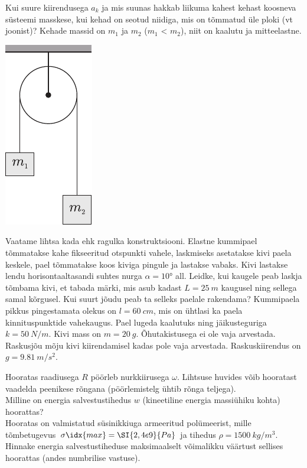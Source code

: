 \documentclass[10pt]{article}
\begin{document}
{%

Kui suure kiirendusega $a_k$ ja mis suunas hakkab liikuma kahest kehast koosneva süsteemi masskese, kui kehad on seotud niidiga, mis on tõmmatud üle ploki (vt joonist)? Kehade massid on $m_1$ ja $m_2$ ($m_1$ < $m_2$), niit on kaalutu ja mitteelastne.
\begin{center}
	\includegraphics[width=0.25\linewidth]{2006-lahg-05-yl}
\end{center}
\probend
\bigskip


Vaatame lihtsa kada ehk ragulka konstruktsiooni. Elastne kummipael tõmmatakse kahe fikseeritud otspunkti vahele, laskmiseks asetatakse kivi paela keskele, pael tõmmatakse koos kiviga pingule ja lastakse vabaks. Kivi lastakse lendu horisontaaltasandi suhtes nurga $\alpha = \ang{10}$ all. Leidke, kui kaugele peab laskja tõmbama kivi, et tabada märki, mis asub kadast $L = \SI{25}{m}$ kaugusel ning sellega samal kõrgusel. Kui suurt jõudu peab ta selleks paelale rakendama? Kummipaela pikkus pingestamata olekus on $l = \SI{60}{cm}$, mis on ühtlasi ka paela kinnituspunktide vahekaugus. Pael lugeda kaalutuks ning jäikusteguriga $k = \SI{50}{N/m}$. Kivi mass on $m = \SI{20}{g}$. Õhutakistusega ei ole vaja arvestada. Raskusjõu mõju kivi kiirendamisel kadas pole vaja arvestada. Raskuskiirendus on $g = \SI{9.81}{m/s^2}$.
\probend
\bigskip


Hooratas raadiusega $R$ pöörleb nurkkiirusega $\omega$. Lihtsuse huvides võib hooratast vaadelda peenikese rõngana (pöörlemistelg ühtib rõnga teljega).\\
\osa Milline on energia salvestustihedus $w$ (kineetiline energia massiühiku kohta) hoorattas?\\
\osa Hooratas on valmistatud süsinikkiuga armeeritud polümeerist, mille tõmbetugevus $\sigma\idx{max} = \SI{2,4e9}{Pa}$ ja tihedus $\rho = \SI{1500}{kg/m^3}$. Hinnake energia salvestustiheduse maksimaalselt võimalikku väärtust sellises hoorattas (andes numbrilise vastuse).

}
\end{document}
